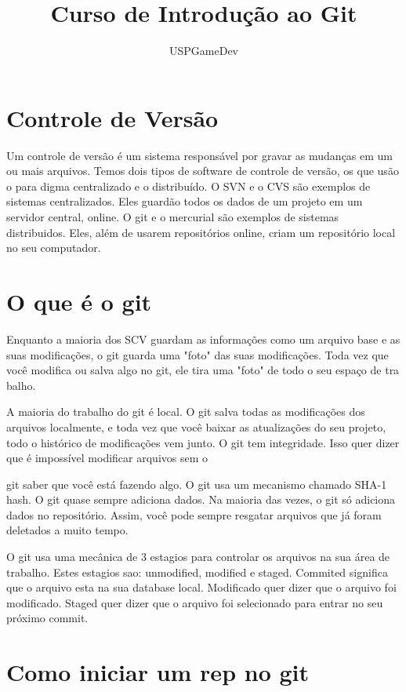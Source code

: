 \documentclass{article}
\begin{document}
\title{Curso de Introdução ao Git}
\author{USPGameDev}
\maketitle

\section{Controle de Versão}
    Um controle de versão é um sistema responsável por gravar as mudanças em um
    ou mais arquivos.
    Temos dois tipos de software de controle de versão, os que usão o para
    digma centralizado e o distribuído. O SVN e o CVS são exemplos de sistemas
    centralizados. Eles guardão todos os dados de um projeto em um servidor central,
    online. O git e o mercurial são exemplos de sistemas distribuidos. Eles, além
    de usarem repositórios online, criam um repositório local no seu computador.

\section{O que é o git}
    Enquanto a maioria dos SCV guardam as informações como um arquivo base e as suas
    modificações, o git guarda uma "foto" das suas modificações. Toda vez que você
    modifica ou salva algo no git, ele tira uma "foto" de todo o seu espaço de tra
    balho.
    
    A maioria do trabalho do git é local. O git salva todas as modificações dos arquivos
    localmente, e toda vez que você baixar as atualizações do seu projeto, todo o
    histórico de modificações vem junto.
    O git tem integridade. Isso quer dizer que é impossível modificar arquivos sem o
    
    git saber que você está fazendo algo. O git usa um mecanismo chamado SHA-1 hash.
    O git quase sempre adiciona dados. Na maioria das vezes, o git só adiciona dados
    no repositório. Assim, você pode sempre resgatar arquivos que já foram deletados
    a muito tempo.
    
    O git usa uma mecânica de 3 estagios para controlar os arquivos na sua área de
    trabalho. Estes estagios sao: unmodified, modified e staged. Commited significa
    que o arquivo esta na sua database local. Modificado quer dizer que o arquivo
    foi modificado. Staged quer dizer que o arquivo foi selecionado para entrar no seu
    próximo commit.

\section{Como iniciar um rep no git}
\end{document}
